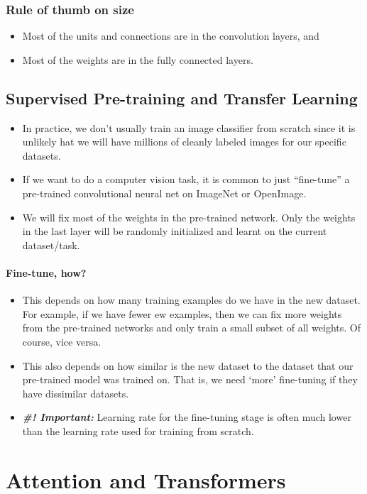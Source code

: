 \documentclass[11pt]{article}
\begin{document}
\subsubsection{Rule of thumb on size}
\begin{itemize}
    \item Most of the units and connections are in the convolution layers, and
    \item Most of the weights are in the fully connected layers. 
\end{itemize}

\subsection{Supervised Pre-training and Transfer Learning}
\begin{itemize}
    \item In practice, we don't usually train an image classifier from scratch since it is unlikely hat we will have millions of cleanly labeled images for our specific datasets. 
    \item If we want to do a computer vision task, it is common to just ``fine-tune'' a pre-trained convolutional neural net on ImageNet or OpenImage. 
    \item We will fix most of the weights in the pre-trained network. Only the weights in the last layer will be randomly initialized and learnt on the current dataset/task. 
\end{itemize}
\paragraph{Fine-tune, how?}
\begin{itemize}
    \item This depends on how many training examples do we have in the new dataset. For example, if we have fewer ew examples, then we can fix more weights from the pre-trained networks and only train a small subset of all weights. Of course, vice versa. 
    \item This also depends on how similar is the new dataset to the dataset that our pre-trained model was trained on. That is, we need `more' fine-tuning if they have dissimilar datasets.
    \item \textit{\textbf{\#! Important:}} Learning rate for the fine-tuning stage is often much lower than the learning rate used for training from scratch. 
\end{itemize}

\section{Attention and Transformers} 












\pagebreak


\end{document}
